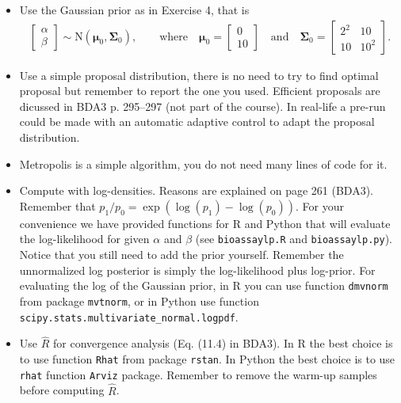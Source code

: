 \documentclass[a4paper,11pt]{article}
\newcommand{\vc}[1] { \mathbf{#1} }
\newcommand{\vs}[1] { \boldsymbol{#1} }
\begin{document}
\begin{itemize}
\item Use the Gaussian prior as in Exercise 4, that is %
\begin{align*}
	\begin{bmatrix}
	\alpha \\ \beta
	\end{bmatrix}
	\sim
	\text{N} \left(\vs \mu_0, \vc \Sigma_0 \right), \qquad
	\text{where} \quad
	\vs \mu_0 = \begin{bmatrix} 0 \\ 10 \end{bmatrix} \quad \text{and} \quad
	\vc \Sigma_0 = \begin{bmatrix} 2^2 & 10 \\ 10 & 10^2 \end{bmatrix}.
\end{align*}
\item Use a simple proposal distribution, there is no need to try to find optimal proposal but remember to report the one you used. Efficient proposals are dicussed in BDA3 p. 295--297 (not part of the course). In real-life a pre-run could be made with an automatic adaptive control to adapt the proposal distribution.
\item Metropolis is a simple algorithm, you do not need many lines of code for it. 
\item Compute with log-densities. Reasons are explained on page 261 (BDA3). Remember that $p_1/p_0=\exp(\log(p_1)-\log(p_0))$. For your convenience we have provided functions for R and Python that will evaluate the log-likelihood for given $\alpha$ and $\beta$ (see {\tt bioassaylp.R} and {\tt bioassaylp.py}). Notice that you still need to add the prior yourself. Remember the unnormalized log posterior is simply the log-likelihood plus log-prior. For evaluating the log of the Gaussian prior, in R you can use function {\tt dmvnorm} from package {\tt mvtnorm}, or in Python use function {\tt scipy.stats.multivariate\_normal.logpdf}.
\item Use $\hat{R}$ for convergence analysis (Eq. (11.4) in BDA3). In R the best choice is to use function {\tt Rhat} from package {\tt rstan}. In Python the best choice is to use {\tt rhat} function {\tt Arviz} package. Remember to remove the warm-up samples before computing $\hat R$. 


\end{itemize}
\end{document}
